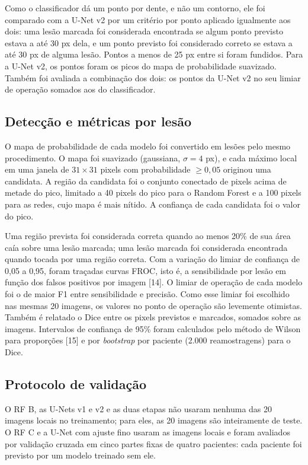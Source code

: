 \documentclass[twocolumn]{article}
\begin{document}
Como o classificador dá um ponto por dente, e não um contorno, ele foi comparado com a U-Net v2 por um critério por ponto aplicado igualmente aos dois: uma lesão marcada foi considerada encontrada se algum ponto previsto estava a até 30 px dela, e um ponto previsto foi considerado correto se estava a até 30 px de alguma lesão. Pontos a menos de 25 px entre si foram fundidos. Para a U-Net v2, os pontos foram os picos do mapa de probabilidade suavizado. Também foi avaliada a combinação dos dois: os pontos da U-Net v2 no seu limiar de operação somados aos do classificador.

\subsection{Detecção e métricas por lesão}

O mapa de probabilidade de cada modelo foi convertido em lesões pelo mesmo procedimento. O mapa foi suavizado (gaussiana, $\sigma = 4$ px), e cada máximo local em uma janela de $31 \times 31$ pixels com probabilidade $\geq 0{,}05$ originou uma candidata. A região da candidata foi o conjunto conectado de pixels acima de metade do pico, limitado a 40 pixels do pico para o Random Forest e a 100 pixels para as redes, cujo mapa é mais nítido. A confiança de cada candidata foi o valor do pico.

Uma região prevista foi considerada correta quando ao menos 20\% de sua área caía sobre uma lesão marcada; uma lesão marcada foi considerada encontrada quando tocada por uma região correta. Com a variação do limiar de confiança de 0,05 a 0,95, foram traçadas curvas FROC, isto é, a sensibilidade por lesão em função dos falsos positivos por imagem [14]. O limiar de operação de cada modelo foi o de maior F1 entre sensibilidade e precisão. Como esse limiar foi escolhido nas mesmas 20 imagens, os valores no ponto de operação são levemente otimistas. Também é relatado o Dice entre os pixels previstos e marcados, somados sobre as imagens. Intervalos de confiança de 95\% foram calculados pelo método de Wilson para proporções [15] e por \textit{bootstrap} por paciente (2.000 reamostragens) para o Dice.

\subsection{Protocolo de validação}

O RF B, as U-Nets v1 e v2 e as duas etapas não usaram nenhuma das 20 imagens locais no treinamento; para eles, as 20 imagens são inteiramente de teste. O RF C e a U-Net com ajuste fino usaram as imagens locais e foram avaliados por validação cruzada em cinco partes fixas de quatro pacientes: cada paciente foi previsto por um modelo treinado sem ele.
\end{document}
